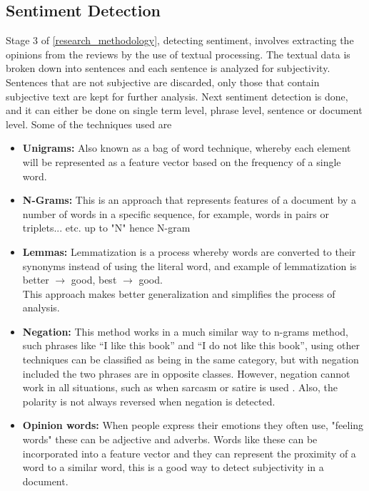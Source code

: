 \subsection{Sentiment Detection}
Stage 3 of \ref{research_methodology}, detecting sentiment, involves extracting the opinions from the reviews by the use of textual processing. The textual data is broken down into sentences and each sentence is analyzed for subjectivity. Sentences that are not subjective are discarded, only those that contain subjective text are kept for further analysis. Next sentiment detection is done, and it can either be done on single term level, phrase level, sentence or document level. Some of the techniques used are

\begin{itemize}

\item \textbf{Unigrams:} Also known as a bag of word technique, whereby each element will be represented as a feature vector based on the frequency of a single word.

\item \textbf{N-Grams:} This is an approach that represents features of a document by a number of words in a specific sequence, for example, words in pairs or triplets... etc. up to "N" hence N-gram

\item \textbf{Lemmas:} Lemmatization is a process whereby words are converted to their synonyms instead of using the literal word, and example of lemmatization is\\
better $\xrightarrow{}$ good, best $\xrightarrow{}$ good.\\
This approach makes better generalization and simplifies the process of analysis.

\item \textbf{Negation:} This method works in a much similar way to n-grams method, such phrases like “I like this book” and “I do not like this book”, using other techniques can be classified as being in the same category, but with negation included the two phrases are in opposite classes. However, negation cannot work in all situations, such as when sarcasm or satire is used \cite{ref19}. Also, the polarity is not always reversed when negation is detected.

\item \textbf{Opinion words:} When people express their emotions they often use, "feeling words" these can be adjective and adverbs. Words like these can be incorporated into a feature vector and they can represent the proximity of a word to a similar word, this is a good way to detect subjectivity in a document.
\end{itemize}

